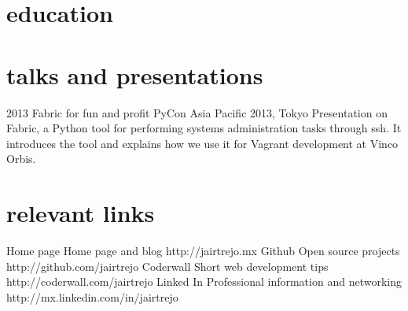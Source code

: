 \documentclass[]{friggeri-cv} %
\def\home{{\FA \faHome}}
\def\github{{\FA \faGithub}}
\def\coderwall{{\FA \faCog}}
\def\linkedin{{\FA \faLinkedinSign}}
\begin{document}
\section{education}

\begin{entrylist}

\end{entrylist}


\section{talks and presentations}

\begin{entrylist}
\entry
{2013}
{Fabric for fun and profit}
{PyCon Asia Pacific 2013, Tokyo}
{Presentation on Fabric, a Python tool for performing systems administration tasks through ssh. It introduces the tool and explains how we use it for Vagrant development at Vinco Orbis.}
\end{entrylist}


\section{relevant links}

\begin{entrylist}
\entry
{Home page}
{\home\enspace Home page and blog}
{}
{http://jairtrejo.mx}
\entry
{Github}
{\github\enspace Open source projects}
{}
{http://github.com/jairtrejo}
\entry
{Coderwall}
{\coderwall\enspace Short web development tips}
{}
{http://coderwall.com/jairtrejo}
\entry
{Linked In}
{\linkedin\enspace Professional information and networking}
{}
{http://mx.linkedin.com/in/jairtrejo}
\end{entrylist}
\end{document}

